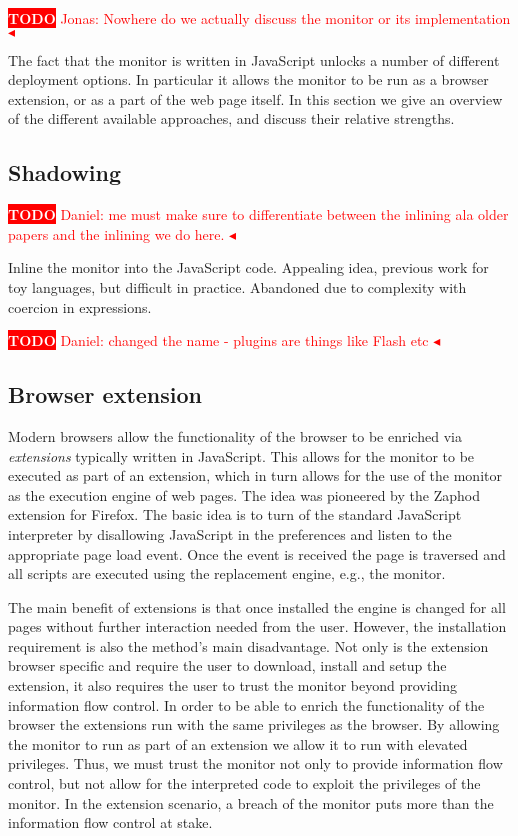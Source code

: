 \documentclass{llncs}
\newcommand{\todo}[1]{\colorbox{red}{\textcolor{white}{\sffamily\bfseries\scriptsize TODO}} \textcolor{red}{#1} \textcolor{red}{$\blacktriangleleft$}}
\begin{document}
\todo{Jonas: Nowhere do we actually discuss the monitor or its implementation}

The fact that the monitor is written in JavaScript unlocks a number of
different deployment options. In particular it allows the monitor to be run as
a browser extension, or as a part of the web page itself.  In this section we
give an overview of the different available approaches, and discuss their
relative strengths.


\subsection{Shadowing}
\todo{Daniel: me must make sure to differentiate between the inlining ala older papers and the inlining we do here.}

Inline the monitor into the JavaScript code. Appealing idea, previous work for 
toy languages, but difficult in practice. Abandoned due to complexity with 
coercion in expressions.


\todo{Daniel: changed the name - plugins are things like Flash etc}
\subsection{Browser extension}
%
Modern browsers allow the functionality of the browser to be enriched via
\emph{extensions} typically written in JavaScript. This allows for the monitor
to be executed as part of an extension, which in turn allows for the use of the
monitor as the execution engine of web pages. The idea was pioneered by the
Zaphod\cite{Zaphod} extension for Firefox.  The basic idea is to turn of the
standard JavaScript interpreter by disallowing JavaScript in the preferences
and listen to the appropriate page load event. Once the event is received the
page is traversed and all scripts are executed using the replacement engine,
e.g., the monitor. 

The main benefit of extensions is that once installed the engine is changed for
all pages without further interaction needed from the user. However, the
installation requirement is also the method's main disadvantage. Not only is
the extension browser specific and require the user to download, install and
setup the extension, it also requires the user to trust the monitor beyond
providing information flow control. In order to be able to enrich the
functionality of the browser the extensions run with the same privileges as the
browser. By allowing the monitor to run as part of an extension we allow it to
run with elevated privileges. Thus, we must trust the monitor not only to
provide information flow control, but not allow for the interpreted code to
exploit the privileges of the monitor. In the extension scenario, a breach of
the monitor puts more than the information flow control at stake.
\end{document}
